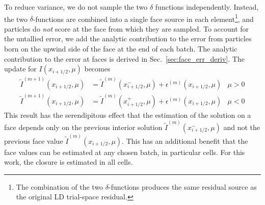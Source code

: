 To reduce variance, we do not sample the two $\delta$ functions independently.
Instead, the
two $\delta$-functions are combined into a single face source in each element\footnote{The combination of the two $\delta$-functions produces the same residual source as the
original LD trial-space residual.},
and particles do \emph{not} score at the face from which they are sampled.  To account for the
untallied error, we add the analytic
contribution to the error from particles born on the upwind side of the face at the end of
each batch.  The analytic contribution to the error at faces is derived in Sec.~\ref{sec:face_err_deriv}. 
The update for $I(x_{i+1/2},\mu)$ becomes
\begin{align}
   \tilde I^{(m+1)}(x_{i+1/2},\mu)  &= \tilde I^{(m)}(x_{i+1/2}^-,\mu) +
   \epsilon^{(m)}(x_{i+1/2},\mu) & \mu > 0 \\
   \tilde I^{(m+1)}(x_{i+1/2},\mu)  &= \tilde I^{(m)}(x_{i+1/2}^+,\mu) +
   \epsilon^{(m)}(x_{i+1/2},\mu) & \mu < 0
\end{align}
This result has the serendipitous effect that the estimation of the solution on a face depends only on
the previous interior solution $\tilde I^{(m)}(x_{i+1/2}^-,\mu)$ and not the previous face value 
$\tilde I^{(m)}(x_{i+1/2},\mu)$. This has an additional benefit that the face values can
be estimated at any chosen batch, in particular cells.  For this work, the closure is
estimated in all cells.


